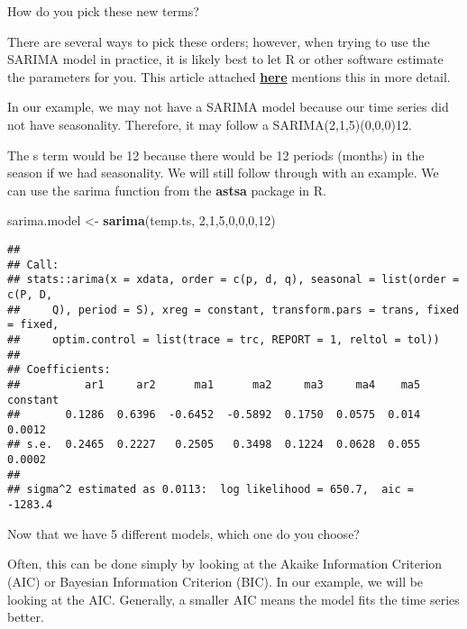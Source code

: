 \documentclass[
]{book}
\newenvironment{Shaded}{\begin{snugshade}}{\end{snugshade}}
\newcommand{\DecValTok}[1]{\textcolor[rgb]{0.00,0.00,0.81}{#1}}
\newcommand{\KeywordTok}[1]{\textcolor[rgb]{0.13,0.29,0.53}{\textbf{#1}}}
\newcommand{\NormalTok}[1]{#1}
\newcommand{\StringTok}[1]{\textcolor[rgb]{0.31,0.60,0.02}{#1}}
\begin{document}
How do you pick these new terms?

There are several ways to pick these orders; however, when trying to use the SARIMA model in practice, it is likely best to let R or other software estimate the parameters for you. This article attached \href{https://medium.com/@rrfd/sarima-modelling-for-car-sharing-basic-data-pipelines-applications-with-python-pt-1-75de4677c0cd\#:~:text=SARIMA\%20models\%20are\%20a\%20general,a\%20constant\%20mean\%20and\%20variance.}{\textbf{here}} mentions this in more detail.

In our example, we may not have a SARIMA model because our time series did not have seasonality. Therefore, it may follow a SARIMA(2,1,5)(0,0,0)12.

The s term would be 12 because there would be 12 periods (months) in the season if we had seasonality. We will still follow through with an example. We can use the sarima function from the \textbf{astsa} package in R.

\begin{Shaded}
\begin{Highlighting}[]
\NormalTok{sarima.model <-}\StringTok{ }\KeywordTok{sarima}\NormalTok{(temp.ts, }\DecValTok{2}\NormalTok{,}\DecValTok{1}\NormalTok{,}\DecValTok{5}\NormalTok{,}\DecValTok{0}\NormalTok{,}\DecValTok{0}\NormalTok{,}\DecValTok{0}\NormalTok{,}\DecValTok{12}\NormalTok{)}
\end{Highlighting}
\end{Shaded}

\begin{verbatim}
## 
## Call:
## stats::arima(x = xdata, order = c(p, d, q), seasonal = list(order = c(P, D, 
##     Q), period = S), xreg = constant, transform.pars = trans, fixed = fixed, 
##     optim.control = list(trace = trc, REPORT = 1, reltol = tol))
## 
## Coefficients:
##          ar1     ar2      ma1      ma2     ma3     ma4    ma5  constant
##       0.1286  0.6396  -0.6452  -0.5892  0.1750  0.0575  0.014    0.0012
## s.e.  0.2465  0.2227   0.2505   0.3498  0.1224  0.0628  0.055    0.0002
## 
## sigma^2 estimated as 0.0113:  log likelihood = 650.7,  aic = -1283.4
\end{verbatim}

Now that we have 5 different models, which one do you choose?

Often, this can be done simply by looking at the Akaike Information Criterion (AIC) or Bayesian Information Criterion (BIC). In our example, we will be looking at the AIC. Generally, a smaller AIC means the model fits the time series better.
\end{document}
